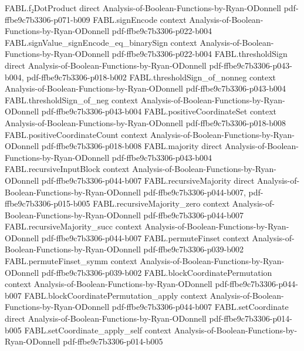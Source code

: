\begin{theorem}
\proofstep
  {FABL.f₂DotProduct}
  {direct}
  {Analysis-of-Boolean-Functions-by-Ryan-ODonnell}
  {pdf-ffbe9c7b3306-p071-b009}
\proofstep
  {FABL.signEncode}
  {context}
  {Analysis-of-Boolean-Functions-by-Ryan-ODonnell}
  {pdf-ffbe9c7b3306-p022-b004}
\proofstep
  {FABL.signValue_signEncode_eq_binarySign}
  {context}
  {Analysis-of-Boolean-Functions-by-Ryan-ODonnell}
  {pdf-ffbe9c7b3306-p022-b004}
\proofstep
  {FABL.thresholdSign}
  {direct}
  {Analysis-of-Boolean-Functions-by-Ryan-ODonnell}
  {pdf-ffbe9c7b3306-p043-b004,
    pdf-ffbe9c7b3306-p018-b002}
\proofstep
  {FABL.thresholdSign_of_nonneg}
  {context}
  {Analysis-of-Boolean-Functions-by-Ryan-ODonnell}
  {pdf-ffbe9c7b3306-p043-b004}
\proofstep
  {FABL.thresholdSign_of_neg}
  {context}
  {Analysis-of-Boolean-Functions-by-Ryan-ODonnell}
  {pdf-ffbe9c7b3306-p043-b004}
\proofstep
  {FABL.positiveCoordinateSet}
  {context}
  {Analysis-of-Boolean-Functions-by-Ryan-ODonnell}
  {pdf-ffbe9c7b3306-p018-b008}
\proofstep
  {FABL.positiveCoordinateCount}
  {context}
  {Analysis-of-Boolean-Functions-by-Ryan-ODonnell}
  {pdf-ffbe9c7b3306-p018-b008}
\proofstep
  {FABL.majority}
  {direct}
  {Analysis-of-Boolean-Functions-by-Ryan-ODonnell}
  {pdf-ffbe9c7b3306-p043-b004}
\proofstep
  {FABL.recursiveInputBlock}
  {context}
  {Analysis-of-Boolean-Functions-by-Ryan-ODonnell}
  {pdf-ffbe9c7b3306-p044-b007}
\proofstep
  {FABL.recursiveMajority}
  {direct}
  {Analysis-of-Boolean-Functions-by-Ryan-ODonnell}
  {pdf-ffbe9c7b3306-p044-b007,
    pdf-ffbe9c7b3306-p015-b005}
\proofstep
  {FABL.recursiveMajority_zero}
  {context}
  {Analysis-of-Boolean-Functions-by-Ryan-ODonnell}
  {pdf-ffbe9c7b3306-p044-b007}
\proofstep
  {FABL.recursiveMajority_succ}
  {context}
  {Analysis-of-Boolean-Functions-by-Ryan-ODonnell}
  {pdf-ffbe9c7b3306-p044-b007}
\proofstep
  {FABL.permuteFinset}
  {context}
  {Analysis-of-Boolean-Functions-by-Ryan-ODonnell}
  {pdf-ffbe9c7b3306-p039-b002}
\proofstep
  {FABL.permuteFinset_symm}
  {context}
  {Analysis-of-Boolean-Functions-by-Ryan-ODonnell}
  {pdf-ffbe9c7b3306-p039-b002}
\proofstep
  {FABL.blockCoordinatePermutation}
  {context}
  {Analysis-of-Boolean-Functions-by-Ryan-ODonnell}
  {pdf-ffbe9c7b3306-p044-b007}
\proofstep
  {FABL.blockCoordinatePermutation_apply}
  {context}
  {Analysis-of-Boolean-Functions-by-Ryan-ODonnell}
  {pdf-ffbe9c7b3306-p044-b007}
\proofstep
  {FABL.setCoordinate}
  {direct}
  {Analysis-of-Boolean-Functions-by-Ryan-ODonnell}
  {pdf-ffbe9c7b3306-p014-b005}
\proofstep
  {FABL.setCoordinate_apply_self}
  {context}
  {Analysis-of-Boolean-Functions-by-Ryan-ODonnell}
  {pdf-ffbe9c7b3306-p014-b005}

\end{theorem}
